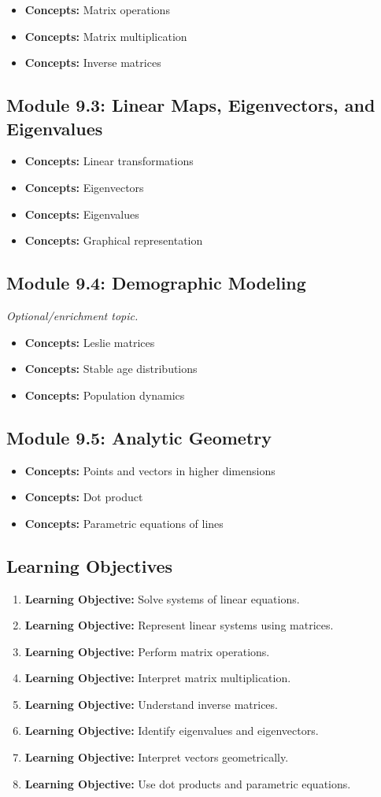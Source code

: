 \documentclass[11pt]{article}
\newcommand{\objective}[1]{\item \textbf{Learning Objective:} #1}
\newcommand{\concept}[1]{\item \textbf{Concepts:} #1}
\begin{document}
\begin{itemize}
    \concept{Matrix operations}
    \concept{Matrix multiplication}
    \concept{Inverse matrices}
\end{itemize}

\subsection{Module 9.3: Linear Maps, Eigenvectors, and Eigenvalues}

\begin{itemize}
    \concept{Linear transformations}
    \concept{Eigenvectors}
    \concept{Eigenvalues}
    \concept{Graphical representation}
\end{itemize}

\subsection{Module 9.4: Demographic Modeling}

\textit{Optional/enrichment topic.}

\begin{itemize}
    \concept{Leslie matrices}
    \concept{Stable age distributions}
    \concept{Population dynamics}
\end{itemize}

\subsection{Module 9.5: Analytic Geometry}

\begin{itemize}
    \concept{Points and vectors in higher dimensions}
    \concept{Dot product}
    \concept{Parametric equations of lines}
\end{itemize}

\subsection{Learning Objectives}

\begin{enumerate}
    \objective{Solve systems of linear equations.}
    \objective{Represent linear systems using matrices.}
    \objective{Perform matrix operations.}
    \objective{Interpret matrix multiplication.}
    \objective{Understand inverse matrices.}
    \objective{Identify eigenvalues and eigenvectors.}
    \objective{Interpret vectors geometrically.}
    \objective{Use dot products and parametric equations.}
\end{enumerate}
\end{document}
